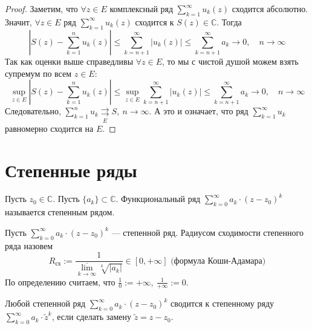 \documentclass[11pt]{article}
\begin{document}
\begin{proof}
    Заметим, что $\forall z \in E$ комплексный ряд $\displaystyle \sum_{k = 1}^{\infty} u_k(z)$ сходится абсолютно. Значит, $\forall z \in E$ ряд $\displaystyle \sum_{k = 1}^{\infty} u_k(z)$ 
    сходится к $S(z) \in \mathbb{C}$. Тогда \[ \left|S(z) - \sum_{k = 1}^{n}u_k(z)\right| \leq \sum_{k = n + 1}^{\infty} |u_k(z)| \leq \sum_{k = n + 1}^{\infty} a_k \to 0, \quad n \to \infty\]
    Так как оценки выше справедливы $\forall z \in E$, то мы с чистой душой можем взять супремум по всем $z \in E$: 
    \[\sup_{z \in E} \left|S(z) - \sum_{k = 1}^{n}u_k(z)\right| \leq \sup_{z \in E} \sum_{k = n + 1}^{\infty} |u_k(z)| \leq \sum_{k = n + 1}^{\infty} a_k \to 0, \quad n \to \infty\] 
    Следовательно, $\displaystyle \sum_{k = 1}^{n} u_k \underset{E}{\rightrightarrows} S, \ n \to \infty$. А это и означает, что ряд $\displaystyle \sum_{k = 1}^{\infty} u_k$  равномерно сходится на $E$.
\end{proof}

\section{Степенные ряды}

\begin{definition}
    Пусть $z_0 \in \mathbb{C}$. Пусть $\{a_k\} \subset \mathbb{C}$. Функциональный ряд $\displaystyle \sum_{k = 0}^{\infty} a_k \cdot (z - z_0)^k$ называется степенным рядом.
\end{definition}

\begin{definition}
    Пусть $\displaystyle \sum_{k = 0}^{\infty} a_k \cdot (z - z_0)^k$ --- степенной ряд. Радиусом сходимости степенного ряда назовем \[R_{\text{сх}} := 
    \frac{1}{\underset{k \to \infty}{\overline{\lim}} \sqrt[k]{|a_k|}} \in [0, +\infty] \text{ (формула Коши-Адамара)}\] По определению считаем, что $\displaystyle \frac{1}{0}
    := +\infty, \ \frac{1}{+\infty} := 0$.
\end{definition}

\begin{remark}
    Любой степенной ряд $\displaystyle \sum_{k = 0}^{\infty} a_k \cdot (z - z_0)^k$ сводится к степенному ряду $\displaystyle \sum_{k = 0}^{\infty} a_k \cdot \widetilde{z}^k$,
    если сделать замену $\widetilde{z} = z - z_0$.
\end{remark}
\end{document}
